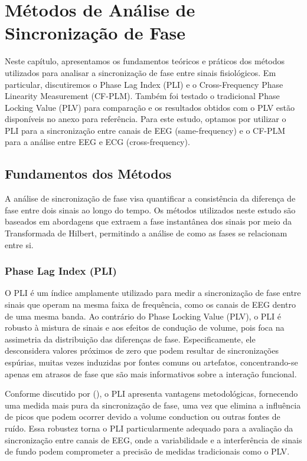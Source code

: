 \chapter{Métodos de Análise de Sincronização de Fase}
\label{chap:6_metodos_de_analise_de_sincronizacao_de_fase}

Neste capítulo, apresentamos os fundamentos teóricos e práticos dos métodos utilizados para analisar a sincronização de fase entre sinais fisiológicos. Em particular, discutiremos o Phase Lag Index (PLI) e o Cross-Frequency Phase Linearity Measurement (CF-PLM). Também foi testado o tradicional Phase Locking Value (PLV) para comparação e os resultados obtidos com o PLV estão disponíveis no anexo para referência. Para este estudo, optamos por utilizar o PLI para a sincronização entre canais de EEG (same-frequency) e o CF-PLM para a análise entre EEG e ECG (cross-frequency).

\section{Fundamentos dos Métodos}

A análise de sincronização de fase visa quantificar a consistência da diferença de fase entre dois sinais ao longo do tempo. Os métodos utilizados neste estudo são baseados em abordagens que extraem a fase instantânea dos sinais por meio da Transformada de Hilbert, permitindo a análise de como as fases se relacionam entre si.

\subsection{Phase Lag Index (PLI)}

O PLI é um índice amplamente utilizado para medir a sincronização de fase entre sinais que operam na mesma faixa de frequência, como os canais de EEG dentro de uma mesma banda. Ao contrário do Phase Locking Value (PLV), o PLI é robusto à mistura de sinais e aos efeitos de condução de volume, pois foca na assimetria da distribuição das diferenças de fase. Especificamente, ele desconsidera valores próximos de zero que podem resultar de sincronizações espúrias, muitas vezes induzidas por fontes comuns ou artefatos, concentrando-se apenas em atrasos de fase que são mais informativos sobre a interação funcional.

Conforme discutido por \citeauthor{seraj2018} (\citeyear{seraj2018}), o PLI apresenta vantagens metodológicas, fornecendo uma medida mais pura da sincronização de fase, uma vez que elimina a influência de picos que podem ocorrer devido a volume conduction ou outras fontes de ruído. Essa robustez torna o PLI particularmente adequado para a avaliação da sincronização entre canais de EEG, onde a variabilidade e a interferência de sinais de fundo podem comprometer a precisão de medidas tradicionais como o PLV.

